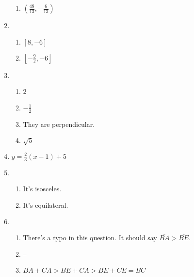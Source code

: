 \documentclass{article}
\begin{document}
\begin{enumerate}
\begin{enumerate}
	\item $(\frac{48}{13}, -\frac{6}{13})$
	
	\end{enumerate}
	
\item

	\begin{enumerate}
	
	\item $[8, -6]$
	
	\item $[-\frac{9}{2}, -6]$
	
	\end{enumerate}

\item

	\begin{enumerate}
	
	\item 2
	
	\item $-\frac{1}{2}$
	
	\item They are perpendicular.
	
	\item $\sqrt{5}$
	
	\end{enumerate}
	
\item $y = \frac{2}{3}(x - 1) + 5$

\item

	\begin{enumerate}
	
	\item It's isosceles.
	
	\item It's equilateral.
	
	\end{enumerate}
	
\item

	\begin{enumerate}
	
	\item There's a typo in this question. It should say $\overline{BA} > \overline{BE}$.
	
	\item --
	
	\item $\overline{BA} + \overline{CA} > \overline{BE} + \overline{CA} > \overline{BE} + \overline{CE} = \overline{BC}$
	

\end{enumerate}
\end{enumerate}
\end{document}
